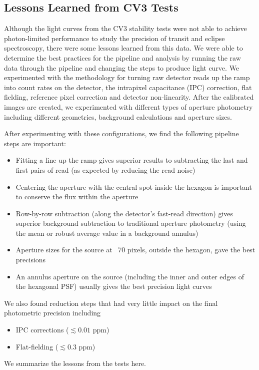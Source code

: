 \documentclass{aastex62}
\begin{document}
\subsection{Lessons Learned from CV3 Tests}\label{sec:CV3Lessons}
Although the light curves from the CV3 stability tests were not able to achieve photon-limited performance to study the precision of transit and eclipse spectroscopy, there were some lessons learned from this data.
We were able to determine the best practices for the pipeline and analysis by running the raw data through the pipeline and changing the steps to produce light curve.
We experimented with the methodology for turning raw detector reads up the ramp into count rates on the detector, the intrapixel capacitance (IPC) correction, flat fielding, reference pixel correction and detector non-linearity.
After the calibrated images are created, we experimented with different types of aperture photometry including different geometries, background calculations and aperture sizes.

After experimenting with these configurations, we find the following pipeline steps are important:
\begin{itemize}
	\item Fitting a line up the ramp gives superior results to subtracting the last and first pairs of read (as expected by reducing the read noise)
	\item Centering the aperture with the central spot inside the hexagon is important to conserve the flux within the aperture
	\item Row-by-row subtraction (along the detector's fast-read direction) gives superior background subtraction to traditional aperture photometry (using the mean or robust average value in a background annulus)
	\item Aperture sizes for the source at ~70 pixels, outside the hexagon, gave the best precisions
	\item An annulus aperture on the source (including the inner and outer edges of the hexagonal PSF) usually gives the best precision light curves
\end{itemize}

We also found reduction steps that had very little impact on the final photometric precision including
\begin{itemize}
	\item IPC corrections ($\lesssim 0.01$ ppm)
	\item Flat-fielding ($\lesssim 0.3$ ppm)
\end{itemize}
We summarize the lessons from the tests here.
\end{document}
